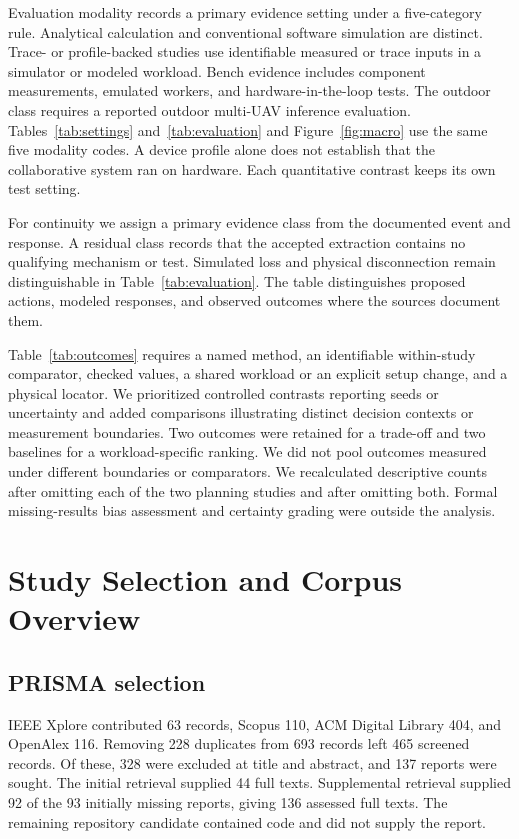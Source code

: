 \documentclass[pdflatex,sn-vancouver-num]{sn-jnl}
\begin{document}
Evaluation modality records a primary evidence setting under a five-category rule. Analytical calculation and conventional software simulation are distinct. Trace- or profile-backed studies use identifiable measured or trace inputs in a simulator or modeled workload. Bench evidence includes component measurements, emulated workers, and hardware-in-the-loop tests. The outdoor class requires a reported outdoor multi-UAV inference evaluation. Tables~\ref{tab:settings} and~\ref{tab:evaluation} and Figure~\ref{fig:macro} use the same five modality codes. A device profile alone does not establish that the collaborative system ran on hardware. Each quantitative contrast keeps its own test setting.

For continuity we assign a primary evidence class from the documented event and response. A residual class records that the accepted extraction contains no qualifying mechanism or test. Simulated loss and physical disconnection remain distinguishable in Table~\ref{tab:evaluation}. The table distinguishes proposed actions, modeled responses, and observed outcomes where the sources document them.

Table~\ref{tab:outcomes} requires a named method, an identifiable within-study comparator, checked values, a shared workload or an explicit setup change, and a physical locator. We prioritized controlled contrasts reporting seeds or uncertainty and added comparisons illustrating distinct decision contexts or measurement boundaries. Two outcomes were retained for a trade-off and two baselines for a workload-specific ranking. We did not pool outcomes measured under different boundaries or comparators. We recalculated descriptive counts after omitting each of the two planning studies and after omitting both. Formal missing-results bias assessment and certainty grading were outside the analysis.

\section{Study Selection and Corpus Overview}\label{sec:selection}
\subsection{PRISMA selection}
IEEE Xplore contributed 63 records, Scopus 110, ACM Digital Library 404, and OpenAlex 116. Removing 228 duplicates from 693 records left 465 screened records. Of these, 328 were excluded at title and abstract, and 137 reports were sought. The initial retrieval supplied 44 full texts. Supplemental retrieval supplied 92 of the 93 initially missing reports, giving 136 assessed full texts. The remaining repository candidate contained code and did not supply the report.
\end{document}
